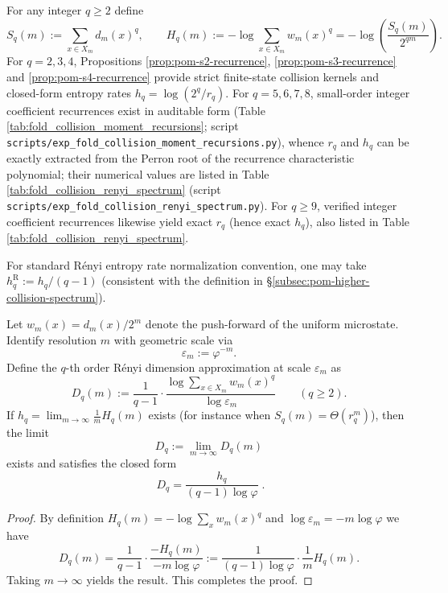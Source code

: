 \begin{remark}[\texorpdfstring{$\mathrm{R\acute{e}nyi}$}{Renyi} fingerprint spectrum: from \texorpdfstring{$q=2,3$}{q=2,3} to higher orders]\label{rem:pom-renyi-spectrum}
For any integer \(q\ge 2\) define
$$
S_q(m):=\sum_{x\in X_m} d_m(x)^q,\qquad
H_q(m):=-\log\sum_{x\in X_m}w_m(x)^q=-\log\!\left(\frac{S_q(m)}{2^{qm}}\right).
$$
For \(q=2,3,4\), Propositions \ref{prop:pom-s2-recurrence}, \ref{prop:pom-s3-recurrence} and \ref{prop:pom-s4-recurrence} provide strict finite-state collision kernels and closed-form entropy rates \(h_q=\log(2^q/r_q)\).
For \(q=5,6,7,8\), small-order integer coefficient recurrences exist in auditable form (Table \ref{tab:fold_collision_moment_recursions}; script \texttt{scripts/exp\_fold\_collision\_moment\_recursions.py}), whence \(r_q\) and \(h_q\) can be exactly extracted from the Perron root of the recurrence characteristic polynomial; their numerical values are listed in Table \ref{tab:fold_collision_renyi_spectrum} (script \texttt{scripts/exp\_fold\_collision\_renyi\_spectrum.py}).
For \(q\ge 9\), verified integer coefficient recurrences likewise yield exact \(r_q\) (hence exact \(h_q\)), also listed in Table \ref{tab:fold_collision_renyi_spectrum}.
\par
For standard Rényi entropy rate normalization convention, one may take \(h_q^{\mathrm{R}}:=h_q/(q-1)\) (consistent with the definition in \S\ref{subsec:pom-higher-collision-spectrum}).
\end{remark}



\begin{proposition}\label{prop:pom-renyi-dimension-spectrum}
Let \(w_m(x)=d_m(x)/2^m\) denote the push-forward of the uniform microstate. Identify resolution \(m\) with geometric scale via
\[
\varepsilon_m:=\varphi^{-m}.
\]
Define the \(q\)-th order Rényi dimension approximation at scale \(\varepsilon_m\) as
\[
D_q(m):=\frac{1}{q-1}\cdot \frac{\log\sum_{x\in X_m}w_m(x)^q}{\log \varepsilon_m}
\qquad(q\ge 2).
\]
If \(h_q=\lim_{m\to\infty}\frac{1}{m}H_q(m)\) exists (for instance when \(S_q(m)=\Theta(r_q^m)\)), then the limit
\[
D_q:=\lim_{m\to\infty}D_q(m)
\]
exists and satisfies the closed form
\[
\boxed{\;
D_q=\frac{h_q}{(q-1)\log\varphi}\; }.
\]
\end{proposition}
\begin{proof}
By definition \(H_q(m)=-\log\sum_x w_m(x)^q\) and \(\log\varepsilon_m=-m\log\varphi\) we have
\[
D_q(m)=\frac{1}{q-1}\cdot \frac{-H_q(m)}{-m\log\varphi}
:=\frac{1}{(q-1)\log\varphi}\cdot \frac{1}{m}H_q(m).
\]
Taking \(m\to\infty\) yields the result. This completes the proof.
\end{proof}

